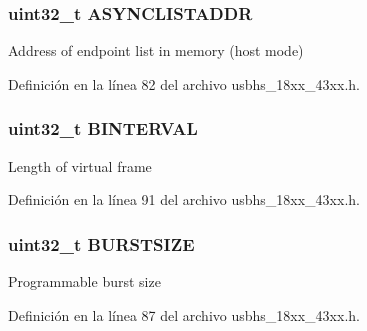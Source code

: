 \subsubsection[{\texorpdfstring{A\+S\+Y\+N\+C\+L\+I\+S\+T\+A\+D\+DR}{ASYNCLISTADDR}}]{ uint32\+\_\+t A\+S\+Y\+N\+C\+L\+I\+S\+T\+A\+D\+DR}\hypertarget{struct_l_p_c___u_s_b_h_s___t_ae8e8b435efd599e7cb730809e3ba6dea}{}\label{struct_l_p_c___u_s_b_h_s___t_ae8e8b435efd599e7cb730809e3ba6dea}
Address of endpoint list in memory (host mode) 

Definición en la línea 82 del archivo usbhs\+\_\+18xx\+\_\+43xx.\+h.

\subsubsection[{\texorpdfstring{B\+I\+N\+T\+E\+R\+V\+AL}{BINTERVAL}}]{ uint32\+\_\+t B\+I\+N\+T\+E\+R\+V\+AL}\hypertarget{struct_l_p_c___u_s_b_h_s___t_a1a34c86d05dddf89fae40a694b7dc8f1}{}\label{struct_l_p_c___u_s_b_h_s___t_a1a34c86d05dddf89fae40a694b7dc8f1}
Length of virtual frame 

Definición en la línea 91 del archivo usbhs\+\_\+18xx\+\_\+43xx.\+h.

\subsubsection[{\texorpdfstring{B\+U\+R\+S\+T\+S\+I\+ZE}{BURSTSIZE}}]{ uint32\+\_\+t B\+U\+R\+S\+T\+S\+I\+ZE}\hypertarget{struct_l_p_c___u_s_b_h_s___t_a7d519a319a72374b4701099098ea8c9c}{}\label{struct_l_p_c___u_s_b_h_s___t_a7d519a319a72374b4701099098ea8c9c}
Programmable burst size 

Definición en la línea 87 del archivo usbhs\+\_\+18xx\+\_\+43xx.\+h.


